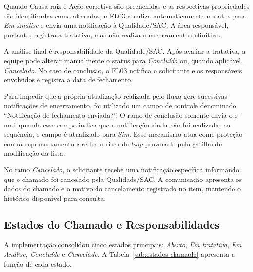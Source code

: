 Quando Causa raiz e Ação corretiva são preenchidas e as
respectivas propriedades são identificadas como alteradas,
o FL03 atualiza automaticamente o status para
\textit{Em Análise} e envia uma notificação à
Qualidade/SAC. A área responsável, portanto, registra a
tratativa, mas não realiza o encerramento definitivo.

A análise final é responsabilidade da Qualidade/SAC. Após
avaliar a tratativa, a equipe pode alterar manualmente o
status para \textit{Concluído} ou, quando aplicável,
\textit{Cancelado}. No caso de conclusão, o FL03 notifica o
solicitante e os responsáveis envolvidos e registra a data
de fechamento.

Para impedir que a própria atualização realizada pelo
fluxo gere sucessivas notificações de encerramento, foi
utilizado um campo de controle denominado
``Notificação de fechamento enviada?''. O ramo de
conclusão somente envia o e-mail quando esse campo indica
que a notificação ainda não foi realizada; na sequência, o
campo é atualizado para \textit{Sim}. Esse mecanismo atua
como proteção contra reprocessamento e reduz o risco de
\textit{loop} provocado pelo gatilho de modificação da
lista.

No ramo \textit{Cancelado}, o solicitante recebe uma
notificação específica informando que o chamado foi
cancelado pela Qualidade/SAC. A comunicação apresenta os
dados do chamado e o motivo do cancelamento registrado no
item, mantendo o histórico disponível para consulta.

\subsection{Estados do Chamado e Responsabilidades}

A implementação consolidou cinco estados principais:
\textit{Aberto}, \textit{Em tratativa}, \textit{Em Análise},
\textit{Concluído} e \textit{Cancelado}. A
Tabela~\ref{tab:estados-chamado} apresenta a função de cada
estado.

